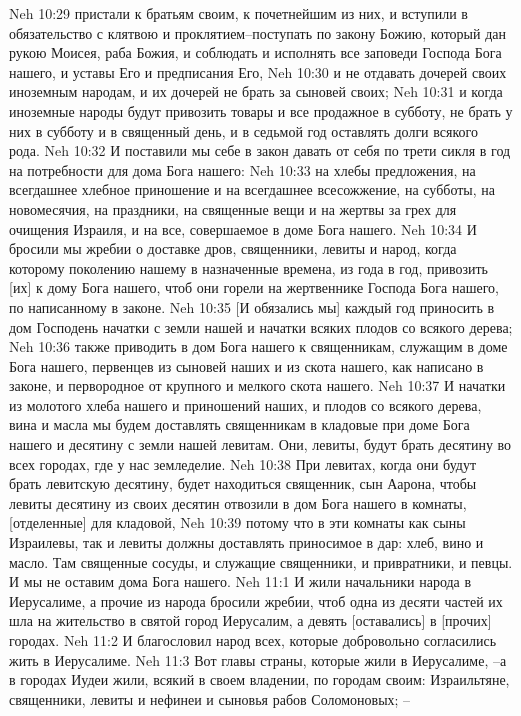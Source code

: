 Neh 10:29  пристали к братьям своим, к почетнейшим из них, и вступили в обязательство с клятвою и проклятием--поступать по закону Божию, который дан рукою Моисея, раба Божия, и соблюдать и исполнять все заповеди Господа Бога нашего, и уставы Его и предписания Его,
Neh 10:30  и не отдавать дочерей своих иноземным народам, и их дочерей не брать за сыновей своих;
Neh 10:31  и когда иноземные народы будут привозить товары и все продажное в субботу, не брать у них в субботу и в священный день, и в седьмой год оставлять долги всякого рода.
Neh 10:32  И поставили мы себе в закон давать от себя по трети сикля в год на потребности для дома Бога нашего:
Neh 10:33  на хлебы предложения, на всегдашнее хлебное приношение и на всегдашнее всесожжение, на субботы, на новомесячия, на праздники, на священные вещи и на жертвы за грех для очищения Израиля, и на все, совершаемое в доме Бога нашего.
Neh 10:34  И бросили мы жребии о доставке дров, священники, левиты и народ, когда которому поколению нашему в назначенные времена, из года в год, привозить [их] к дому Бога нашего, чтоб они горели на жертвеннике Господа Бога нашего, по написанному в законе.
Neh 10:35  [И обязались мы] каждый год приносить в дом Господень начатки с земли нашей и начатки всяких плодов со всякого дерева;
Neh 10:36  также приводить в дом Бога нашего к священникам, служащим в доме Бога нашего, первенцев из сыновей наших и из скота нашего, как написано в законе, и первородное от крупного и мелкого скота нашего.
Neh 10:37  И начатки из молотого хлеба нашего и приношений наших, и плодов со всякого дерева, вина и масла мы будем доставлять священникам в кладовые при доме Бога нашего и десятину с земли нашей левитам. Они, левиты, будут брать десятину во всех городах, где у нас земледелие.
Neh 10:38  При левитах, когда они будут брать левитскую десятину, будет находиться священник, сын Аарона, чтобы левиты десятину из своих десятин отвозили в дом Бога нашего в комнаты, [отделенные] для кладовой,
Neh 10:39  потому что в эти комнаты как сыны Израилевы, так и левиты должны доставлять приносимое в дар: хлеб, вино и масло. Там священные сосуды, и служащие священники, и привратники, и певцы. И мы не оставим дома Бога нашего.
Neh 11:1  И жили начальники народа в Иерусалиме, а прочие из народа бросили жребии, чтоб одна из десяти частей их шла на жительство в святой город Иерусалим, а девять [оставались] в [прочих] городах.
Neh 11:2  И благословил народ всех, которые добровольно согласились жить в Иерусалиме.
Neh 11:3  Вот главы страны, которые жили в Иерусалиме, --а в городах Иудеи жили, всякий в своем владении, по городам своим: Израильтяне, священники, левиты и нефинеи и сыновья рабов Соломоновых; --

